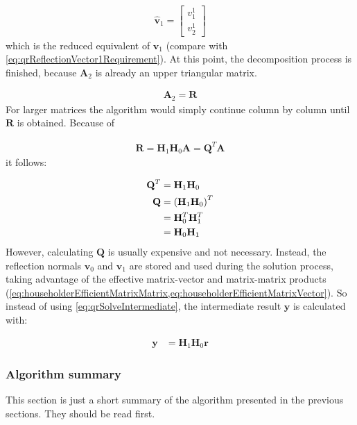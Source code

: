 \begin{align}
\mathbf{\hat{v}}_1
=
\begin{bmatrix}
v_1^1\\
v_2^1
\end{bmatrix}
\end{align}
%
which is the reduced equivalent of $\mathbf{v}_1$ (compare with \cref{eq:qrReflectionVector1Requirement}).
At this point, the decomposition process is finished, because $\mathbf{A}_2$ is already an upper triangular matrix.

\begin{align}
\mathbf{A}_2 = \mathbf{R}
\end{align}
%
For larger matrices the algorithm would simply continue column by column until $\mathbf{R}$ is obtained.
Because of 

\begin{align}
\mathbf{R} = \mathbf{H}_1\mathbf{H}_0\mathbf{A} = \mathbf{Q}^T\mathbf{A}
\end{align}
%
it follows: 

\begin{align}
\mathbf{Q}^T &= \mathbf{H}_1\mathbf{H}_0\\
\nonumber
\mathbf{Q}   &= \left(\mathbf{H}_1\mathbf{H}_0\right)^T\\
\nonumber
&= \mathbf{H}_0^T\mathbf{H}_1^T\\
&= \mathbf{H}_0\mathbf{H}_1
\end{align}
%
However, calculating $\mathbf{Q}$ is usually expensive and not necessary. Instead, the reflection normals $\mathbf{v}_0$ and $\mathbf{v}_1$ are stored and used during the solution process, taking advantage of the effective matrix-vector and matrix-matrix products (\cref{eq:householderEfficientMatrixMatrix,eq:householderEfficientMatrixVector}).
So instead of using \cref{eq:qrSolveIntermediate}, the intermediate result $\mathbf{y}$ is calculated with:

\begin{align}
\mathbf{y} &= \mathbf{H}_1\mathbf{H}_0\mathbf{r}
\end{align}
%




\subsubsection{Algorithm summary}

This section is just a short summary of the algorithm presented in the previous sections.
They should be read first.

